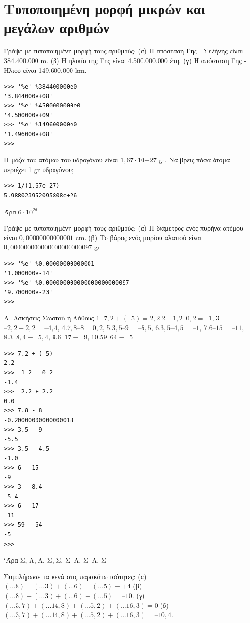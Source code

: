 \section{Τυποποιημένη μορφή μικρών και μεγάλων αριθμών}
\begin{exercise}
Γράψε με  τυποποιημένη  μορφή τους  αριθμούς:
(α)  Η  απόσταση  Γης - Σελήνης είναι 384.400.000 m.
(β)  Η  ηλικία  της Γης είναι 4.500.000.000 έτη.
(γ)  Η  απόσταση  Γης - Ήλιου είναι 149.600.000 km.
\end{exercise}
\begin{lstlisting}
>>> '%e' %384400000e0
'3.844000e+08'
>>> '%e' %4500000000e0
'4.500000e+09'
>>> '%e' %149600000e0
'1.496000e+08'
>>>
\end{lstlisting}
\begin{exercise}
H μάζα  του ατόμου  του υδρογόνου είναι $1,67\cdot 10{-27}$ gr.
Να βρεις πόσα άτομα περιέχει 1 gr υδρογόνου;
\end{exercise}
\begin{lstlisting}
>>> 1/(1.67e-27)
5.988023952095808e+26
\end{lstlisting}
Άρα $6\cdot 10^{26}$.
\begin{exercise}
Γράψε με  τυποποιημένη  μορφή τους  αριθμούς:
(α)  Η  διάμετρος ενός  πυρήνα  ατόμου  είναι $0,00000000000001$ cm.
(β)  Το βάρος ενός  μορίου  αλατιού είναι $0,000000000000000000000097$ gr.
\end{exercise}
\begin{lstlisting}
>>> '%e' %0.00000000000001
'1.000000e-14'
>>> '%e' %0.000000000000000000000097
'9.700000e-23'
>>>
\end{lstlisting}
\begin{exercise}
Α. Ασκήσεις Σωστού ή Λάθους
1. $7,2 + (–5) = 2,2$
2. $–1,2 – 0,2 = –1$, 
3.$ –2,2 + 2,2 = –4,4$, 
4.$ 7,8 – 8 = 0,2$, 
5.$ 3,5 – 9 = –5,5$, 
6.$ 3,5 – 4,5 = –1$, 
7.$ 6 – 15 = –11$, 
8.$ 3 – 8,4 = –5,4$, 
9.$ 6 – 17 = –9$, 
10.$ 59 – 64 = –5 $
\end{exercise}
\begin{lstlisting} 
>>> 7.2 + (-5)
2.2
>>> -1.2 - 0.2
-1.4
>>> -2.2 + 2.2
0.0
>>> 7.8 - 8
-0.20000000000000018
>>> 3.5 - 9
-5.5
>>> 3.5 - 4.5
-1.0
>>> 6 - 15
-9
>>> 3 - 8.4
-5.4
>>> 6 - 17
-11
>>> 59 - 64
-5
>>>
\end{lstlisting}
`Άρα Σ, Λ, Λ, Σ, Σ, Σ, Λ, Σ, Λ, Σ.
\begin{exercise}
Συμπλήρωσε  τα  κενά  στις  παρακάτω  ισότητες:
 (α) $(\ldots 8)+(\ldots 3)+(\ldots 6)+(\ldots 5)=+4$
 (β) $(\ldots 8)+(\ldots 3)+(\ldots 6)+(\ldots 5)=–10$.
 (γ)$(\ldots 3,7)+(\ldots 14,8)+(\ldots 5,2)+(\ldots 16,3)=0$ 
 (δ)$ (\ldots 3,7)+(\ldots 14,8)+(\ldots 5,2)+(\ldots 16,3)=–10,4$.
 \end{exercise}
